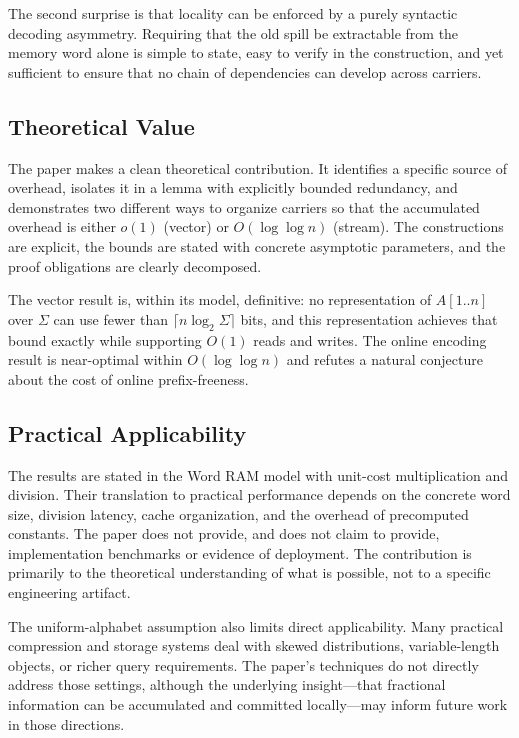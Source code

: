 The second surprise is that locality can be enforced by a purely syntactic
decoding asymmetry.  Requiring that the old spill be extractable from the
memory word alone is simple to state, easy to verify in the construction, and
yet sufficient to ensure that no chain of dependencies can develop across
carriers.

\subsection{Theoretical Value}

The paper makes a clean theoretical contribution.  It identifies a specific
source of overhead, isolates it in a lemma with explicitly bounded
redundancy, and demonstrates two different ways to organize carriers so that
the accumulated overhead is either $o(1)$ (vector) or $O(\log\log n)$
(stream).  The constructions are explicit, the bounds are stated with
concrete asymptotic parameters, and the proof obligations are clearly
decomposed.

The vector result is, within its model, definitive: no representation of
$A[1..n]$ over $\Sigma$ can use fewer than $\lceil n\log_2\Sigma\rceil$
bits, and this representation achieves that bound exactly while supporting
$O(1)$ reads and writes.  The online encoding result is near-optimal within
$O(\log\log n)$ and refutes a natural conjecture about the cost of online
prefix-freeness.

\subsection{Practical Applicability}

The results are stated in the Word RAM model with unit-cost multiplication
and division.  Their translation to practical performance depends on the
concrete word size, division latency, cache organization, and the overhead of
precomputed constants.  The paper does not provide, and does not claim to
provide, implementation benchmarks or evidence of deployment.  The
contribution is primarily to the theoretical understanding of what is
possible, not to a specific engineering artifact.

The uniform-alphabet assumption also limits direct applicability.  Many
practical compression and storage systems deal with skewed distributions,
variable-length objects, or richer query requirements.  The paper's
techniques do not directly address those settings, although the underlying
insight---that fractional information can be accumulated and committed
locally---may inform future work in those directions.

